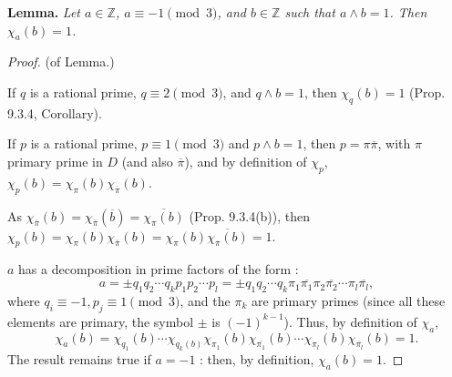 \documentclass[11pt,a4paper]{article}
\newcommand{\Z}{\mathbb{Z}}
\begin{document}
\bigskip

{\bf Lemma.} {\it Let $a \in \Z$, $a \equiv -1 \pmod 3$, and $b\in \Z$ such that $a \wedge b = 1$. Then $\chi_a(b)= 1$.}

\bigskip

\begin{proof}(of Lemma.)

If $q$ is a rational prime, $q \equiv 2 \pmod 3$, and $q \wedge b = 1$, then $\chi_q(b) = 1$ (Prop. 9.3.4, Corollary).

If $p$ is a rational prime, $p \equiv 1 \pmod 3$ and $p \wedge b = 1$, then $p = \pi \overline{\pi}$, with $\pi$ primary prime in $D$ (and also $\overline{\pi}$), and by definition of $\chi_p$, $\chi_p(b) = \chi_\pi(b) \chi_{\overline{\pi}}(b)$.

As $\chi_{\overline{\pi}}(b) = \chi_{\overline{\pi}}(\overline{b}) = \overline{\chi_\pi(b)}$ (Prop. 9.3.4(b)), then $\chi_p(b)  = \chi_\pi(b) \chi_{\overline{\pi}}(b) = \chi_\pi(b)\overline{\chi_\pi(b)}= 1$.

$a$ has a decomposition in prime  factors of the form :
$$a = \pm q_1q_2\cdots q_k p_1p_2\cdots p_l = \pm q_1q_2\cdots q_k \pi_1 \overline{\pi_1} \pi_2 \overline{\pi_2}\cdots \pi_l \overline{\pi_l},$$
where $q_i \equiv -1 , p_j \equiv 1 \pmod 3$, and  the $\pi_k$ are primary primes (since all these elements are primary, the symbol $\pm$ is $(-1)^{k-1}$).
Thus, by definition of $\chi_a$,
$$\chi_a(b) = \chi_{q_1}(b)\cdots \chi_{q_k(b)} \chi_{\pi_1}(b)\chi_{\overline{\pi_1}}(b)\cdots \chi_{\pi_l}(b)\chi_{\overline{\pi_l}}(b) = 1.$$
The result remains true if $a = -1$ : then, by definition, $\chi_a(b) = 1$.

\end{proof}

\bigskip
\end{document}
